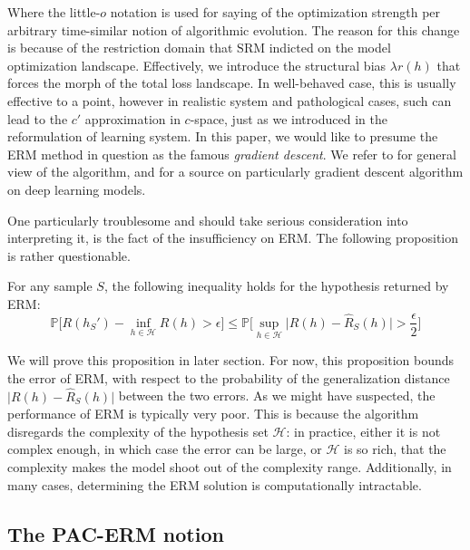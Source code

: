 \documentclass[
  journal=largetwo,
  year=2025,
  volume=37,
]{cup-journal}
\begin{document}
Where the little-$o$ notation is used for saying of the optimization strength per arbitrary time-similar notion of algorithmic evolution. The reason for this change is because of the restriction domain that $\mathrm{SRM}$ indicted on the model optimization landscape. Effectively, we introduce the structural bias $\lambda r(h)$ that forces the morph of the total loss landscape. In well-behaved case, this is usually effective to a point, however in realistic system and pathological cases, such can lead to the $c'$ approximation in $c$-space, just as we introduced in the reformulation of learning system. In this paper, we would like to presume the ERM method in question as the famous \textit{gradient descent}. We refer to \cite{achlioptas_stochastic_nodate,ruder_overview_2017} for general view of the algorithm, and \cite{zhang_gradient_2019} for a source on particularly gradient descent algorithm on deep learning models. 

One particularly troublesome and should take serious consideration into interpreting it, is the fact of the insufficiency on ERM. The following proposition is rather questionable. 
\begin{proposition}
    For any sample $S$, the following inequality holds for the hypothesis returned by ERM: 
    \begin{equation}
        \mathbb{P}\Big[R(h_{S}')- \inf_{h\in \mathcal{H}}R(h) > \epsilon\Big] \leq \mathbb{P}\Big[ \sup_{h\in \mathcal{H}} \lvert R(h)- \hat{R}_{S}(h) \rvert > \frac{\epsilon}{2} \Big]
    \end{equation}
\end{proposition}
We will prove this proposition in later section. For now, this proposition bounds the error of ERM, with respect to the probability of the generalization distance $\lvert R(h)- \hat{R}_{S}(h)\rvert$ between the two errors. As we might have suspected, the performance of ERM is typically very poor. This is because the algorithm disregards the complexity of the hypothesis set $\mathcal{H}$: in practice, either it is not complex enough, in which case the error can be large, or $\mathcal{H}$ is so rich, that the complexity makes the model shoot out of the complexity range. Additionally, in many cases, determining the ERM solution is computationally intractable. 

\subsection{The PAC-ERM notion}
\end{document}
